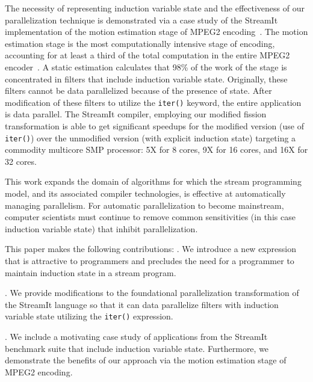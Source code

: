 The necessity of representing induction variable state and the
effectiveness of our parallelization technique is demonstrated via a
case study of the StreamIt implementation of the motion estimation
stage of MPEG2 encoding~\cite{ipdps2006}. The motion estimation stage
is the most computationally intensive stage of encoding, accounting
for at least a third of the total computation in the entire MPEG2
encoder~\cite{drake-thesis}. A static estimation calculates that 98\%
of the work of the stage is concentrated in filters that include
induction variable state. Originally, these filters cannot be data
parallelized because of the presence of state. After modification of
these filters to utilize the {\tt iter()} keyword, the entire
application is data parallel. The StreamIt compiler, employing our
modified fission transformation is able to get significant speedups
for the modified version (use of {\tt iter()}) over the unmodified
version (with explicit induction state) targeting a commodity
multicore SMP processor: 5X for 8 cores, 9X for 16 cores, and 16X for
32 cores.

This work expands the domain of algorithms for which the stream
programming model, and its associated compiler technologies, is
effective at automatically managing parallelism. For automatic
parallelization to become mainstream, computer scientists must
continue to remove common sensitivities (in this case induction
variable state) that inhibit parallelization.

This paper makes the following contributions:
\vspace{-4pt}
\mybegin
{}. We introduce a new expression that is attractive to
  programmers and precludes the need for a programmer to maintain
  induction state in a stream program.

  . We
  provide modifications to the foundational parallelization
  transformation of the StreamIt language so that it can
  data parallelize filters with induction variable state utilizing the
  {\tt iter()} expression.

. We include a
motivating case study of applications from the StreamIt benchmark
suite that include induction variable state.  Furthermore, we
demonstrate the benefits of our approach via the motion estimation
stage of MPEG2 encoding.

\myend

